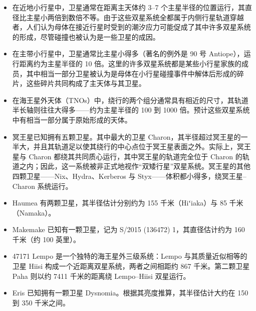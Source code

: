 \begin{itemize}
\item 在近地小行星中，卫星通常在距离主天体约 3--7 个主星半径的位置运行，其直径比主星小两倍到数倍不等。由于这些双星系统全都属于内侧行星轨道穿越者，人们认为母体在接近行星时受到的潮汐应力可能促成了其中许多双星系统的形成，尽管碰撞也被认为是一些卫星的成因。
\item 在主带小行星中，卫星通常比主星小得多（著名的例外是 90 号 Antiope），运行距离约为主星半径的 10 倍。这里的许多双星系统都是某些小行星家族的成员，其中相当一部分卫星被认为是母体在小行星碰撞事件中解体后形成的碎片，这些碎片共同构成了主天体与其卫星。
\item 在海王星外天体（TNOs）中，绕行的两个组分通常具有相近的尺寸，其轨道半长轴则往往大得多——约为主星半径的 100 到 1000 倍。预计这些双星系统中有相当一部分属于原始形成的天体。
\item 冥王星已知拥有五颗卫星。其中最大的卫星 Charon，其半径超过冥王星的一半大，并且其轨道足以使其绕行的中心点位于冥王星表面之外。实际上，冥王星与 Charon 都绕其共同质心运行，其中冥王星的轨道完全位于 Charon 的轨道之内；因此，这一系统被非正式地视作“双矮行星”双星系统。冥王星的其他四颗卫星——Nix、Hydra、Kerberos 与 Styx——体积都小得多，绕冥王星–Charon 系统运行。
\item Haumea 有两颗卫星，其半径估计分别约为 155 千米（Hiʻiaka）与 85 千米（Namaka）。
\item Makemake 已知有一颗卫星，记为 S/2015 (136472) 1，其直径估计约为 160 千米（约 100 英里）。
\item 47171 Lempo 是一个独特的海王星外三级系统：Lempo 与其质量近似相等的卫星 Hiisi 构成一个近距离双星系统，两者之间相距约 867 千米。第二颗卫星 Paha 则以约 7411 千米的距离绕 Lempo–Hiisi 双星运行。
\item Eris 已知拥有一颗卫星 Dysnomia。根据其亮度推算，其半径估计大约在 150 到 350 千米之间。
\end{itemize}
